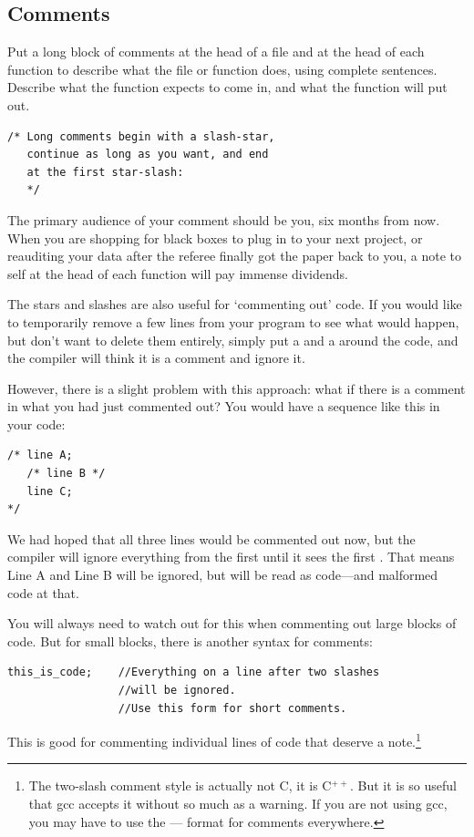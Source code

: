 \documentclass[12pt]{article}
\begin{document}
\subsection{Comments} 
Put a long block of comments 
at the head of a file and at the head of each function to describe what
the file or function does, using complete sentences. Describe what the
function expects to come in, and what the function will put out.
\begin{verbatim}
/* Long comments begin with a slash-star,
   continue as long as you want, and end 
   at the first star-slash:   
   */
\end{verbatim}
The primary audience of your comment should be you, six months from
now. When you are shopping for black boxes to plug in to your next project,
or reauditing your data after the referee finally got the paper back
to you, a note to self at the head of each function will pay immense
dividends.


The stars and slashes are also useful for `commenting out' code. If
you would
like to temporarily remove a few lines from your program to see what
would
happen, but don't want to delete them entirely, simply put a \cinline{/*}
and a \cinline{*/} around the code, and the compiler will think it is a
comment and ignore it.

However, there is a slight problem with this approach: what if there is a comment in what you had just
commented out? You would have a sequence like this in your code: 
\begin{lstlisting}
/* line A; 
   /* line B */ 
   line C; 
*/
\end{lstlisting}
We had hoped that all three lines would be commented out now, but the compiler will ignore everything
from the first \cinline{/*} until it sees the first \cinline{*/}. That means Line A and Line B will be ignored,
but  will be read as code---and malformed code at that.

You will always need to watch out for this when commenting out large blocks of code. But for small
blocks, there is another syntax for comments:
\begin{verbatim}
this_is_code;    //Everything on a line after two slashes 
                 //will be ignored.
                 //Use this form for short comments.
\end{verbatim}
This is good for commenting individual lines of code that deserve a
note.\footnote{The two-slash comment style is actually not C, it is
C$^{++}$. But it is so useful that gcc accepts it without so much as a
warning. If you are not using gcc, you may have to use the \cinline{/*}
--- \cinline{*/} format for comments everywhere.}
\end{document}
